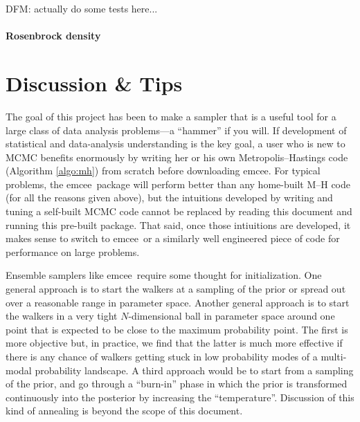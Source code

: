 \documentclass[12pt,preprint]{aastex}
\newcommand{\project}[1]{{\sffamily #1}}
\newcommand{\thisplain}{emcee}
\newcommand{\this}{\project{\thisplain}}
\newcommand{\algo}[1]{Algorithm \ref{algo:#1}}
\begin{document}
DFM: actually do some tests here...

\paragraph{Rosenbrock density}

\section{Discussion \& Tips}


The goal of this project has been to make a sampler that is a useful
tool for a large class of data analysis problems---a ``hammer'' if you
will.  If development of statistical and data-analysis understanding
is the key goal, a user who is new to MCMC benefits enormously by
writing her or his own Metropolis--Hastings code (\algo{mh}) from
scratch before downloading \this.  For typical problems, the
\this\ package will perform better than any home-built M--H code (for
all the reasons given above), but the intuitions developed by writing
and tuning a self-built MCMC code cannot be replaced by reading this
document and running this pre-built package.  That said, once those
intiuitions are developed, it makes sense to switch to \this\ or a
similarly well engineered piece of code for performance on large
problems.

Ensemble samplers like \this\ require some thought for
initialization.  One general approach is to start the walkers at a
sampling of the prior or spread out over a reasonable range in
parameter space.  Another general approach is to start the walkers in
a very tight $N$-dimensional ball in parameter space around one point
that is expected to be close to the maximum probability point.  The
first is more objective but, in practice, we find that the latter is
much more effective if there is any chance of walkers getting stuck in
low probability modes of a multi-modal probability landscape.  A third
approach would be to start from a sampling of the prior, and go
through a ``burn-in'' phase in which the prior is transformed
continuously into the posterior by increasing the ``temperature''.
Discussion of this kind of annealing is beyond the scope of this
document.
\end{document}

